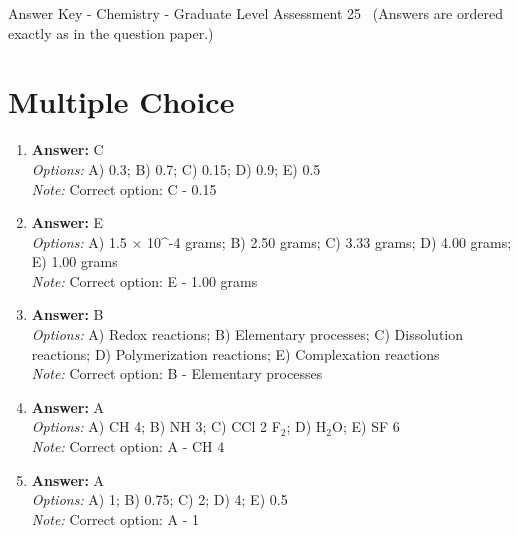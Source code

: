 \documentclass[12pt]{article}
\begin{document}
\begin{center}
Answer Key - Chemistry - Graduate Level Assessment 25 \
\small (Answers are ordered exactly as in the question paper.)
\end{center}

\section*{Multiple Choice}
\begin{enumerate}[label=\arabic*.]
\item \textbf{Answer:} C
\\ \textit{Options:} A) 0.3; B) 0.7; C) 0.15; D) 0.9; E) 0.5
\\ \textit{Note:} Correct option: C - 0.15
\item \textbf{Answer:} E
\\ \textit{Options:} A) 1.5 \ensuremath{\times} 10^-4 grams; B) 2.50 grams; C) 3.33 grams; D) 4.00 grams; E) 1.00 grams
\\ \textit{Note:} Correct option: E - 1.00 grams
\item \textbf{Answer:} B
\\ \textit{Options:} A) Redox reactions; B) Elementary processes; C) Dissolution reactions; D) Polymerization reactions; E) Complexation reactions
\\ \textit{Note:} Correct option: B - Elementary processes
\item \textbf{Answer:} A
\\ \textit{Options:} A) CH 4; B) NH 3; C) CCl 2 F$_{2}$; D) H$_{2}$O; E) SF 6
\\ \textit{Note:} Correct option: A - CH 4
\item \textbf{Answer:} A
\\ \textit{Options:} A) 1; B) 0.75; C) 2; D) 4; E) 0.5
\\ \textit{Note:} Correct option: A - 1
\end{enumerate}
\end{document}
